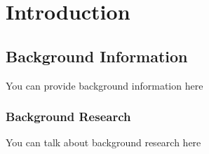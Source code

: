 \chapter{Introduction}

\section{Background Information}

You can provide background information here




\subsection{Background Research}

You can talk about background research here